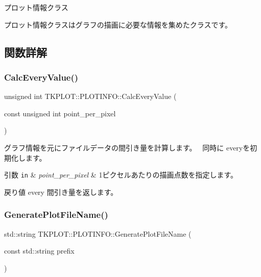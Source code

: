 プロット情報クラス

プロット情報クラスはグラフの描画に必要な情報を集めたクラスです。 

\subsection{関数詳解}
\mbox{\label{class_t_k_p_l_o_t_1_1_p_l_o_t_i_n_f_o_aba014d5ce5807ab0e1c1a2bfb2aca7dd}} 
\subsubsection{\texorpdfstring{Calc\+Every\+Value()}{CalcEveryValue()}}
{\footnotesize\ttfamily unsigned int T\+K\+P\+L\+O\+T\+::\+P\+L\+O\+T\+I\+N\+F\+O\+::\+Calc\+Every\+Value (\begin{DoxyParamCaption}\item[{const unsigned int}]{point\+\_\+per\+\_\+pixel }\end{DoxyParamCaption})\hspace{0.3cm}{\ttfamily [inline]}}



グラフ情報を元にファイルデータの間引き量を計算します。~\newline
同時に everyを初期化します。 


\begin{DoxyParams}[1]{引数}
\mbox{\tt in}  & {\em point\+\_\+per\+\_\+pixel} & 1ピクセルあたりの描画点数を指定します。 \\
\hline
\end{DoxyParams}
\begin{DoxyReturn}{戻り値}
every 間引き量を返します。 
\end{DoxyReturn}
\mbox{\label{class_t_k_p_l_o_t_1_1_p_l_o_t_i_n_f_o_aa5593f16a8756e42b0ba5e82f79ffd11}} 
\subsubsection{\texorpdfstring{Generate\+Plot\+File\+Name()}{GeneratePlotFileName()}}
{\footnotesize\ttfamily std\+::string T\+K\+P\+L\+O\+T\+::\+P\+L\+O\+T\+I\+N\+F\+O\+::\+Generate\+Plot\+File\+Name (\begin{DoxyParamCaption}\item[{const std\+::string}]{prefix }\end{DoxyParamCaption})\hspace{0.3cm}{\ttfamily [inline]}}



